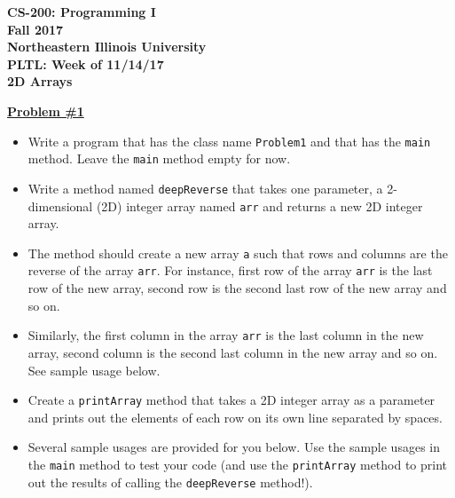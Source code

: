 \documentclass[12pt]{article}
\begin{document}
\begin{center}
	\textbf{CS-200: Programming I}\\
	\textbf{Fall 2017}\\
	\textbf{Northeastern Illinois University}\\
	\textbf{PLTL: Week of 11/14/17}\\
	\textbf{2D Arrays}
\end{center}


\noindent\underline{\textbf{Problem \#1}}
\begin{itemize}
	\item Write a program that has the class name \texttt{Problem1} and that has the \texttt{main} method. Leave the \texttt{main} method empty for now.
	\item Write a method named \texttt{deepReverse} that takes one parameter, a 2-dimensional (2D) integer array named \texttt{arr} and returns a new 2D integer array.
	\item The method should create a new array \texttt{a} such that rows and columns are the reverse of the array \texttt{arr}. For instance, first row of the array \texttt{arr} is the last row of the new array, second row is the second last row of the new array and so on.  
	\item Similarly, the first column in the array \texttt{arr} is the last column in the new array, second column is the second last column in the new array and so on. See sample usage below.
	\item Create a \texttt{printArray} method that takes a 2D integer array as a parameter and prints out the elements of each row on its own line separated by spaces.
	\item Several sample usages are provided for you below. Use the sample usages in the \texttt{main} method to test your code (and use the \texttt{printArray} method to print out the results of calling the \texttt{deepReverse} method!).
\end{itemize}
\end{document}
